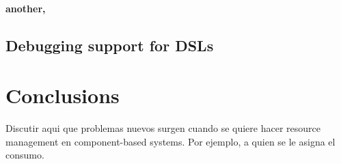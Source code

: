\paragraph{another, \cite{Harkema:2002:PMJ:584369.584388}}

\subsection{Debugging support for DSLs}

\section{Conclusions}

Discutir aqui que problemas nuevos surgen cuando se quiere hacer resource management en component-based systems. Por ejemplo, a quien se le asigna el consumo.


